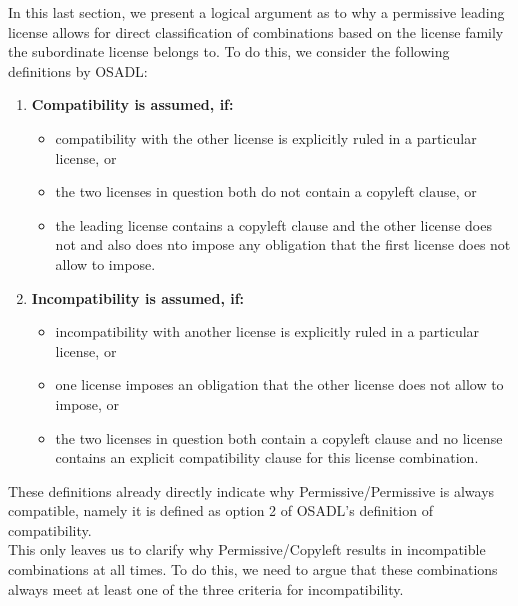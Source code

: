In this last section, we present a logical argument as to why a permissive leading license allows for direct classification of combinations based on the license family the subordinate license belongs to. To do this, we consider the following definitions by OSADL: 
\begin{enumerate}
	\item \textbf{Compatibility is assumed, if:}
	\begin{itemize}
		\item compatibility with the other license is explicitly ruled in a particular license, or
		\item the two licenses in question both do not contain a copyleft clause, or
		\item the leading license contains a copyleft clause and the other license does not and also does nto impose any obligation that the first license does not allow to impose.
	\end{itemize}
	
	\item \textbf{Incompatibility is assumed, if:}
	\begin{itemize}
		\item incompatibility with another license is explicitly ruled in a particular license, or
		\item one license imposes an obligation that the other license does not allow to impose, or
		\item the two licenses in question both contain a copyleft clause and no license contains an explicit compatibility clause for this license combination.
	\end{itemize}
\end{enumerate}

These definitions already directly indicate why Permissive/Permissive is always compatible, namely it is defined as option 2 of OSADL's definition of compatibility. \\

This only leaves us to clarify why Permissive/Copyleft results in incompatible combinations at all times. To do this, we need to argue that these combinations always meet at least one of the three criteria for incompatibility.

